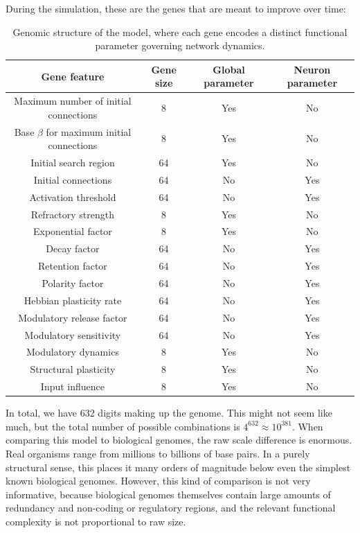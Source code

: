 \documentclass[12pt,a4paper]{article}
\begin{document}
	During the simulation, these are the genes that are meant to improve over time:
	\begin{table}[h]
	\centering
	\begin{tabular}{|c|c|c|c|}
		\hline
		\textbf{Gene feature} & \textbf{Gene size} & \textbf{Global parameter} & \textbf{Neuron parameter}\\
		\hline
		Maximum number of initial connections & 8 & Yes & No\\
		\hline
		Base $\beta$ for maximum initial connections & 8 & Yes & No\\
		\hline
		Initial search region & 64 & Yes & No\\
		\hline
		Initial connections & 64 & No & Yes\\
		\hline
		Activation threshold & 64 & No & Yes\\
		\hline
		Refractory strength & 8 & Yes & No\\
		\hline
		Exponential factor & 8 & Yes & No\\
		\hline
		Decay factor & 64 & No & Yes\\
		\hline
		Retention factor & 64 & No & Yes\\
		\hline
		Polarity factor & 64 & No & Yes\\
		\hline
		Hebbian plasticity rate & 64 & No & Yes\\
		\hline
		Modulatory release factor & 64 & No & Yes\\
		\hline
		Modulatory sensitivity & 64 & No & Yes\\
		\hline
		Modulatory dynamics & 8 & Yes & No\\
		\hline
		Structural plasticity & 8 & Yes & No\\
		\hline
		Input influence & 8 & Yes & No\\
		\hline
	\end{tabular}
	\caption{\footnotesize{Genomic structure of the model, where each gene encodes a distinct functional parameter governing network dynamics.}}
	\label{model_gens}
	\end{table}
	
	In total, we have 632 digits making up the genome. This might not seem like much, but the total number of possible combinations is $4^{632} \approx 10^{381}$. When comparing this model to biological genomes, the raw scale difference is enormous. Real organisms range from millions to billions of base pairs. In a purely structural sense, this places it many orders of magnitude below even the simplest known biological genomes. However, this kind of comparison is not very informative, because biological genomes themselves contain large amounts of redundancy and non-coding or regulatory regions, and the relevant functional complexity is not proportional to raw size.
\end{document}

